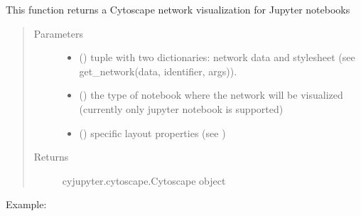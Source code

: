 \documentclass[letterpaper,10pt,english]{sphinxmanual}
\begin{document}
\begin{fulllineitems}
\label{\detokenize{_autosummary/analytics_core.viz:analytics_core.viz.viz.visualize_notebook_network}}
This function returns a Cytoscape network visualization for Jupyter notebooks
\begin{quote}\begin{description}
\item[{Parameters}] \leavevmode\begin{itemize}
\item {} 
 () \textendash{} tuple with two dictionaries: network data and stylesheet (see get\_network(data, identifier, args)).

\item {} 
 () \textendash{} the type of notebook where the network will be visualized (currently only jupyter notebook is supported)

\item {} 
 () \textendash{} specific layout properties (see )

\end{itemize}

\item[{Returns}] \leavevmode
cyjupyter.cytoscape.Cytoscape object

\end{description}\end{quote}

Example:


\end{fulllineitems}
\end{document}
